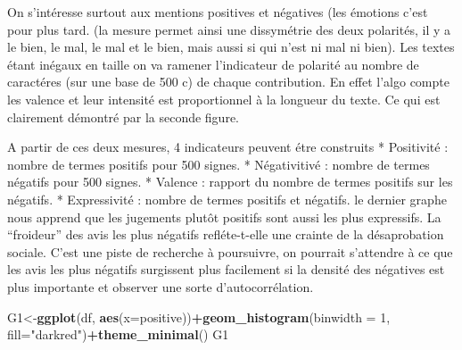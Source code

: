 \documentclass[
]{book}
\newenvironment{Shaded}{\begin{snugshade}}{\end{snugshade}}
\newcommand{\CommentTok}[1]{\textcolor[rgb]{0.56,0.35,0.01}{\textit{#1}}}
\newcommand{\DataTypeTok}[1]{\textcolor[rgb]{0.13,0.29,0.53}{#1}}
\newcommand{\DecValTok}[1]{\textcolor[rgb]{0.00,0.00,0.81}{#1}}
\newcommand{\KeywordTok}[1]{\textcolor[rgb]{0.13,0.29,0.53}{\textbf{#1}}}
\newcommand{\NormalTok}[1]{#1}
\newcommand{\OperatorTok}[1]{\textcolor[rgb]{0.81,0.36,0.00}{\textbf{#1}}}
\newcommand{\StringTok}[1]{\textcolor[rgb]{0.31,0.60,0.02}{#1}}
\begin{document}
\begin{Shaded}
\end{Shaded}

On s'intéresse surtout aux mentions positives et négatives (les émotions c'est pour plus tard. (la mesure permet ainsi une dissymétrie des deux polarités, il y a le bien, le mal, le mal et le bien, mais aussi si qui n'est ni mal ni bien).
Les textes étant inégaux en taille on va ramener l'indicateur de polarité au nombre de caractéres (sur une base de 500 c) de chaque contribution. En effet l'algo compte les valence et leur intensité est proportionnel à la longueur du texte. Ce qui est clairement démontré par la seconde figure.

A partir de ces deux mesures, 4 indicateurs peuvent étre construits
* Positivité : nombre de termes positifs pour 500 signes.
* Négativitivé : nombre de termes négatifs pour 500 signes.
* Valence : rapport du nombre de termes positifs sur les négatifs.
* Expressivité : nombre de termes positifs et négatifs.
le dernier graphe nous apprend que les jugements plutôt positifs sont aussi les plus expressifs. La ``froideur'' des avis les plus négatifs refléte-t-elle une crainte de la désaprobation sociale. C'est une piste de recherche à poursuivre, on pourrait s'attendre à ce que les avis les plus négatifs surgissent plus facilement si la densité des négatives est plus importante et observer une sorte d'autocorrélation.

\begin{Shaded}
\begin{Highlighting}[]
\NormalTok{G1<-}\KeywordTok{ggplot}\NormalTok{(df, }\KeywordTok{aes}\NormalTok{(}\DataTypeTok{x=}\NormalTok{positive))}\OperatorTok{+}\KeywordTok{geom_histogram}\NormalTok{(}\DataTypeTok{binwidth =} \DecValTok{1}\NormalTok{, }\DataTypeTok{fill=}\StringTok{"darkred"}\NormalTok{)}\OperatorTok{+}\KeywordTok{theme_minimal}\NormalTok{()}
\NormalTok{G1}
\end{Highlighting}
\end{Shaded}
\end{document}
